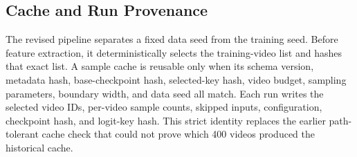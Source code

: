 \subsection{Cache and Run Provenance}

The revised pipeline separates a fixed data seed from the training seed.
Before feature extraction, it deterministically selects the training-video
list and hashes that exact list. A sample cache is reusable only when its schema
version, metadata hash, base-checkpoint hash, selected-key hash, video budget,
sampling parameters, boundary width, and data seed all match. Each run writes
the selected video IDs, per-video sample counts, skipped inputs, configuration,
checkpoint hash, and logit-key hash. This strict identity replaces the earlier
path-tolerant cache check that could not prove which 400 videos produced the
historical cache.
